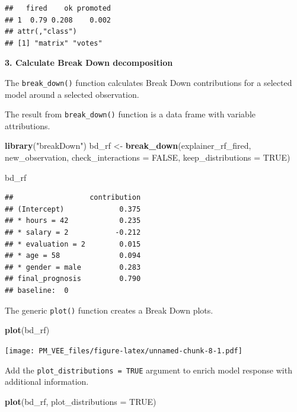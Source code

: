 \documentclass[]{book}
\newenvironment{Shaded}{\begin{snugshade}}{\end{snugshade}}
\newcommand{\DataTypeTok}[1]{\textcolor[rgb]{0.13,0.29,0.53}{#1}}
\newcommand{\KeywordTok}[1]{\textcolor[rgb]{0.13,0.29,0.53}{\textbf{#1}}}
\newcommand{\NormalTok}[1]{#1}
\newcommand{\OtherTok}[1]{\textcolor[rgb]{0.56,0.35,0.01}{#1}}
\newcommand{\StringTok}[1]{\textcolor[rgb]{0.31,0.60,0.02}{#1}}
\theoremstyle{definition}
\theoremstyle{definition}
\theoremstyle{definition}
\theoremstyle{remark}
\begin{document}
\begin{verbatim}
##   fired    ok promoted
## 1  0.79 0.208    0.002
## attr(,"class")
## [1] "matrix" "votes"
\end{verbatim}

\textbf{3. Calculate Break Down decomposition}

The \texttt{break\_down()} function calculates Break Down contributions
for a selected model around a selected observation.

The result from \texttt{break\_down()} function is a data frame with
variable attributions.

\begin{Shaded}
\begin{Highlighting}[]
\KeywordTok{library}\NormalTok{(}\StringTok{"breakDown"}\NormalTok{)}
\NormalTok{bd_rf <-}\StringTok{ }\KeywordTok{break_down}\NormalTok{(explainer_rf_fired,}
\NormalTok{                 new_observation,}
                 \DataTypeTok{check_interactions =} \OtherTok{FALSE}\NormalTok{,}
                 \DataTypeTok{keep_distributions =} \OtherTok{TRUE}\NormalTok{)}

\NormalTok{bd_rf}
\end{Highlighting}
\end{Shaded}

\begin{verbatim}
##                  contribution
## (Intercept)             0.375
## * hours = 42            0.235
## * salary = 2           -0.212
## * evaluation = 2        0.015
## * age = 58              0.094
## * gender = male         0.283
## final_prognosis         0.790
## baseline:  0
\end{verbatim}

The generic \texttt{plot()} function creates a Break Down plots.

\begin{Shaded}
\begin{Highlighting}[]
\KeywordTok{plot}\NormalTok{(bd_rf) }
\end{Highlighting}
\end{Shaded}

\texttt{[image: PM\_VEE\_files/figure-latex/unnamed-chunk-8-1.pdf]}

Add the \texttt{plot\_distributions\ =\ TRUE} argument to enrich model
response with additional information.

\begin{Shaded}
\begin{Highlighting}[]
\KeywordTok{plot}\NormalTok{(bd_rf, }\DataTypeTok{plot_distributions =} \OtherTok{TRUE}\NormalTok{) }
\end{Highlighting}
\end{Shaded}
\end{document}
